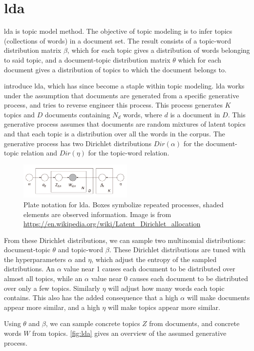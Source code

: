 \section{\acrlong{lda}}\label{sec:lda}
\Gls{lda} is topic model method. The objective of topic modeling is to infer topics (collections of words) in a document set.
The result consists of a topic-word distribution matrix $\beta$, which for each topic gives a distribution of words belonging to said topic, and a document-topic distribution matrix $\theta$ which for each document gives a distribution of topics to which the document belongs to.

\citeauthor{lda} \cite{lda} introduce \gls{lda}, which has since become a staple within topic modeling.
\gls{lda} works under the assumption that documents are generated from a specific generative process, and tries to reverse engineer this process.
This process generates $K$ topics and $D$ documents containing $N_{d}$ words, where $d$ is a document in $D$.
This generative process assumes that documents are random mixtures of latent topics and that each topic is a distribution over all the words in the corpus.
The generative process has two Dirichlet distributions $Dir(\alpha)$ for the document-topic relation and $Dir(\eta)$ for the topic-word relation.

\begin{figure}[h]
	\centering
	\includegraphics[width=0.5\textwidth]{figures/Smoothed_LDA.jpg}
	\caption{Plate notation for \gls{lda}. Boxes symbolize repeated processes, shaded elements are observed information. Image is from \url{https://en.wikipedia.org/wiki/Latent_Dirichlet_allocation}}
	\label{fig:lda}
\end{figure}
From these Dirichlet distributions, we can sample two multinomial distributions: document-topic $\theta$ and topic-word $\beta$.
These Dirichlet distributions are tuned with the hyperparameters $\alpha$ and $\eta$, which adjust the entropy of the sampled distributions.
An $\alpha$ value near 1 causes each document to be distributed over almost all topics, while an $\alpha$ value near 0 causes each document to be distributed over only a few topics.
Similarly $\eta$ will adjust how many words each topic contains.
This also has the added consequence that a high $\alpha$ will make documents appear more similar, and a high $\eta$ will make topics appear more similar.

Using $\theta$ and $\beta$, we can sample concrete topics $Z$ from documents, and concrete words $W$ from topics.
\autoref{fig:lda} gives an overview of the assumed generative process.
